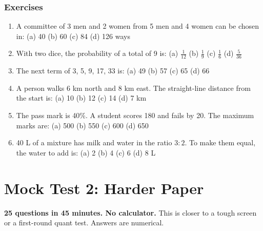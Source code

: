 \documentclass[11pt,a4paper,openany]{report}
\newenvironment{exercises}{\subsection*{Exercises \thechapter}\begin{enumerate}[label=\textbf{\thechapter.\arabic*},leftmargin=3.2em]}{\end{enumerate}}
\begin{document}
\begin{exercises}
\item A committee of 3 men and 2 women from 5 men and 4 women can be chosen in: (a) 40 (b) 60 (c) 84 (d) 126 ways
\item With two dice, the probability of a total of 9 is: (a) $\frac1{12}$ (b) $\frac19$ (c) $\frac16$ (d) $\frac5{36}$
\item The next term of 3, 5, 9, 17, 33 is: (a) 49 (b) 57 (c) 65 (d) 66
\item A person walks 6 km north and 8 km east. The straight-line distance from the start is: (a) 10 (b) 12 (c) 14 (d) 7 km
\item The pass mark is 40\%. A student scores 180 and fails by 20. The maximum marks are: (a) 500 (b) 550 (c) 600 (d) 650
\item 40 L of a mixture has milk and water in the ratio $3:2$. To make them equal, the water to add is: (a) 2 (b) 4 (c) 6 (d) 8 L
\end{exercises}

\chapter{Mock Test 2: Harder Paper}\label{ch:mock2}
\textbf{25 questions in 45 minutes. No calculator.} This is closer to a tough screen or a first-round quant test. Answers are numerical.
\end{document}
